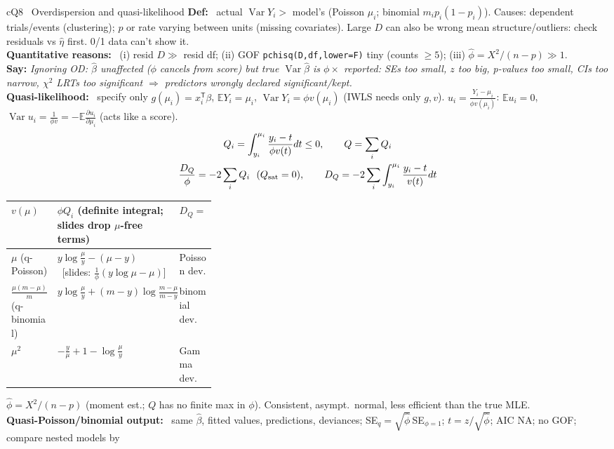 \documentclass{article}
\newcommand{\h}[1]{{\bfseries #1}\ }
\newcommand{\say}[1]{{\color{cMC!75!black}\textbf{Say:}} \emph{#1}}
\newcommand{\E}{\mathbb E}
\newcommand{\V}{\operatorname{Var}}
\newcommand{\tsp}{^{\mathsf T}}
\newcommand{\rc}[1]{\texttt{#1}}
\begin{document}
\begin{multicols*}{3}
\begin{tb}{cQ}{8 \textbullet\ Overdispersion and quasi-likelihood}
\h{Def:} actual $\V Y_i>$ model's (Poisson $\mu_i$; binomial $m_ip_i(1-p_i)$). Causes: dependent trials/events (clustering); $p$ or rate varying between units (missing covariates). Large $D$ can also be wrong mean structure/outliers: check residuals vs $\hat\eta$ first. 0/1 data can't show it.\\
\h{Quantitative reasons:} (i) resid $D\gg$ resid df; (ii) GOF \rc{pchisq(D,df,lower=F)} tiny (counts $\ge5$); (iii) $\hat\phi=X^2/(n-p)\gg1$.\\
\say{Ignoring OD: $\hat\beta$ unaffected ($\phi$ cancels from score) but true $\V\hat\beta$ is $\phi\times$ reported: SEs too small, $z$ too big, p-values too small, CIs too narrow, $\chi^2$ LRTs too significant $\Rightarrow$ predictors wrongly declared significant/kept.}\\
\h{Quasi-likelihood:} specify only $g(\mu_i)=x_i\tsp\beta$, $\E Y_i=\mu_i$, $\V Y_i=\phi v(\mu_i)$ (IWLS needs only $g,v$). $u_i=\frac{Y_i-\mu_i}{\phi v(\mu_i)}$: $\E u_i=0$, $\V u_i=\frac1{\phi v}=-\E\frac{\partial u_i}{\partial\mu_i}$ (acts like a score).
\[\begin{gathered}Q_i=\int_{y_i}^{\mu_i}\frac{y_i-t}{\phi v(t)}dt\le0,\qquad Q=\sum_i Q_i\\ \frac{D_Q}{\phi}=-2\sum_i Q_i\ \ (Q_{\rm sat}=0),\qquad D_Q=-2\sum_i\int_{y_i}^{\mu_i}\frac{y_i-t}{v(t)}dt\end{gathered}\]
\begin{tabularx}{\linewidth}{@{}>{\raggedright\arraybackslash}p{0.2\linewidth}|L|>{\raggedright\arraybackslash}p{0.14\linewidth}@{}}
$v(\mu)$ & $\phi Q_i$ (definite integral; slides drop $\mu$-free terms) & $D_Q=$\\\hline
$\mu$ (q-Poisson) & $y\log\frac\mu y-(\mu-y)$ \ [slides: $\frac1\phi(y\log\mu-\mu)$] & Poisson dev.\\
$\frac{\mu(m-\mu)}m$ (q-binomial) & $y\log\frac\mu y+(m-y)\log\frac{m-\mu}{m-y}$ & binomial dev.\\
$\mu^2$ & $-\frac y\mu+1-\log\frac\mu y$ & Gamma dev.\\
\end{tabularx}
$\hat\phi=X^2/(n-p)$ (moment est.; $Q$ has no finite max in $\phi$). Consistent, asympt.\ normal, less efficient than the true MLE.\\
\h{Quasi-Poisson/binomial output:} same $\hat\beta$, fitted values, predictions, deviances; SE$_q=\sqrt{\hat\phi}\,$SE$_{\phi=1}$; $t=z/\sqrt{\hat\phi}$; AIC NA; no GOF; compare nested models by

\end{tb}
\end{multicols*}
\end{document}
